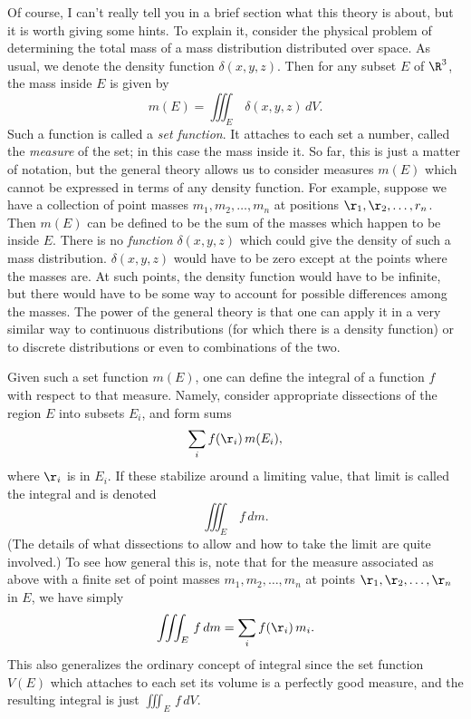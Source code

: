 Of course, I can't really tell you in a brief section what this
theory is about, but it is worth giving some hints.   To explain
it, consider the physical problem of determining the total
mass of a mass distribution distributed over space.  As usual,
we denote
the density function $\delta(x,y,z)$. 
  Then for any subset $E$ of
$\R^3$, the mass inside $E$ is given by
$$
    m(E) = \iiint_E\,\delta(x,y,z)\,dV.
$$
Such a function is called a {\it set function}.   It attaches
to each set a number, called the {\it measure\/} of the
set; in this case the mass inside it.   So far, this is just a
%
matter of notation, but the general theory allows us to
consider measures $m(E)$ which cannot be expressed in terms
of any density function.   For example, suppose we have a
collection of point masses $m_1, m_2, \dots, m_n$ at positions
$\r_1, \r_2,\dots, r_n$.   Then $m(E)$ can be defined to be the 
sum of
the masses which happen to be inside $E$.   There is no 
{\it function\/} $\delta(x,y,z)$ which could give the density
of such a mass distribution.  $\delta(x,y,z)$ would have to be
zero except at the points where the masses are.  At such
points, the density function would have to be infinite, 
but there would have
to be some way to account for possible differences among the
masses.
  The power
of the general theory is that one can apply it in a very
similar way to continuous distributions (for which there is
a density function) or to discrete distributions or even
to combinations of the two.

Given  such a set function $m(E)$, one can define the
integral of a function $f$ 
with respect to that
measure.   Namely, consider appropriate dissections
of the region $E$ into subsets $E_i$, and form sums  
$$
     \sum_i f(\r_i)\,m(E_i),
$$
where $\r_i$ is in $E_i$.
If these stabilize around a limiting value, that limit is called
the integral and is denoted
$$
    \iiint_E \,f\,dm.
$$
(The details of what dissections to allow and how to take the
limit are quite involved.)
To see how general this is, note that for the measure associated
as above with a finite set of
point masses $m_1, m_2, \dots, m_n$ at points
$\r_1,\r_2,\dots,\r_n$ in $E$,  we have simply
$$
     \iiint_E\, f\,dm = \sum_i f(\r_i)\,m_i.
$$
This also generalizes the ordinary concept of integral since the
set function $V(E)$ which attaches to each set its volume is
a perfectly good measure, and the resulting integral is just
$\iiint_E\,f\,dV$. 

